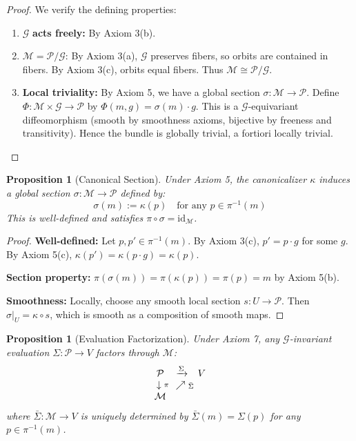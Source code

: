 \documentclass[11pt]{article}
\newtheorem{proposition}[theorem]{Proposition}
\begin{document}
\begin{proof}
We verify the defining properties:
\begin{enumerate}
    \item $\mathcal{G}$ \textbf{acts freely:} By Axiom 3(b).

    \item $\mathcal{M} = \mathcal{P}/\mathcal{G}$: By Axiom 3(a), $\mathcal{G}$ preserves fibers, so orbits are contained in fibers. By Axiom 3(c), orbits equal fibers. Thus $\mathcal{M} \cong \mathcal{P}/\mathcal{G}$.

    \item \textbf{Local triviality:} By Axiom 5, we have a global section $\sigma : \mathcal{M} \to \mathcal{P}$. Define $\Phi : \mathcal{M} \times \mathcal{G} \to \mathcal{P}$ by $\Phi(m, g) = \sigma(m) \cdot g$. This is a $\mathcal{G}$-equivariant diffeomorphism (smooth by smoothness axioms, bijective by freeness and transitivity). Hence the bundle is globally trivial, a fortiori locally trivial. \qedhere
\end{enumerate}
\end{proof}

\begin{proposition}[Canonical Section]
\label{prop:section}
Under Axiom 5, the canonicalizer $\kappa$ induces a global
section $\sigma : \mathcal{M} \to \mathcal{P}$ defined by:
\[
\sigma(m) := \kappa(p) \quad \text{for any } p \in \pi^{-1}(m)
\]
This is well-defined and satisfies $\pi \circ \sigma = \mathrm{id}_{\mathcal{M}}$.
\end{proposition}

\begin{proof}
\textbf{Well-defined:} Let $p, p' \in \pi^{-1}(m)$. By Axiom 3(c), $p' = p \cdot g$ for some $g$. By Axiom
5(c), $\kappa(p') = \kappa(p \cdot g) = \kappa(p)$.

\textbf{Section property:} $\pi(\sigma(m)) = \pi(\kappa(p)) = \pi(p) = m$ by Axiom 5(b).

\textbf{Smoothness:} Locally, choose any smooth local section $s : U \to \mathcal{P}$. Then $\sigma|_U = \kappa \circ s$, which
is smooth as a composition of smooth maps.
\end{proof}

\begin{proposition}[Evaluation Factorization]
\label{prop:factorization}
Under Axiom 7, any $\mathcal{G}$-invariant evaluation $\Sigma :
\mathcal{P} \to V$ factors through $\mathcal{M}$:
\[
\begin{array}{ccc}
\mathcal{P} & \xrightarrow{\Sigma} & V \\
\downarrow\vcenter{\rlap{$\scriptstyle\pi$}} & \nearrow\vcenter{\rlap{$\scriptstyle\bar{\Sigma}$}} & \\
\mathcal{M} & &
\end{array}
\]
where $\bar{\Sigma} : \mathcal{M} \to V$ is uniquely determined by $\bar{\Sigma}(m) = \Sigma(p)$ for any $p \in \pi^{-1}(m)$.
\end{proposition}
\end{document}
